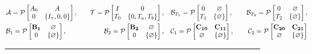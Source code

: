 \documentclass[twocolumn]{autart}    %
\begin{document}
\begin{figure*}[ht] %
    \flushleft
\begin{equation}
    \begin{aligned}
        &\mathcal{A} = \mathcal{P} 
            \begin{bmatrix}
                A_{0} & A \\
                0 & \{I_{\tau},0,0\} 
            \end{bmatrix} ,\quad &\mathcal{T} = \mathcal{P} 
            \begin{bmatrix}
                I & 0 \\
                T_{0} & \{0,T_{a},T_{b}\} 
            \end{bmatrix},\quad &\mathcal{B}_{T_{1}} = \mathcal{P} 
            \begin{bmatrix}
                0 & \varnothing \\
                T_{1} & \{\varnothing\} 
            \end{bmatrix} ,\quad &\mathcal{B}_{T_{2}} = \mathcal{P} 
            \begin{bmatrix}
                0 & \varnothing \\
                T_{2} & \{\varnothing\} 
            \end{bmatrix},\\
        &\mathcal{B}_{1} = \mathcal{P} 
        \begin{bmatrix}
            \bold{B_{1}} & \varnothing \\
            0 & \{\varnothing\} 
        \end{bmatrix},\quad &\mathcal{B}_{2} = \mathcal{P} 
        \begin{bmatrix}
            \bold{B_{2}} & \varnothing \\
            0 & \{\varnothing\} 
        \end{bmatrix},\quad &\mathcal{C}_{1} = \mathcal{P} 
        \begin{bmatrix}
            \bold{C_{10}} & \bold{C_{11}} \\
            \varnothing & \{\varnothing\} 
        \end{bmatrix}, \quad &\mathcal{C}_{2} = \mathcal{P} 
        \begin{bmatrix}
            \bold{C_{20}} & \bold{C_{21}} \\
            \varnothing & \{\varnothing\} 
        \end{bmatrix}
    \end{aligned}
\end{equation}
\vspace{1.5em}
{\noindent}	 \rule[-10pt]{17.5cm}{0.05em}\\
\end{figure*}
\end{document}

